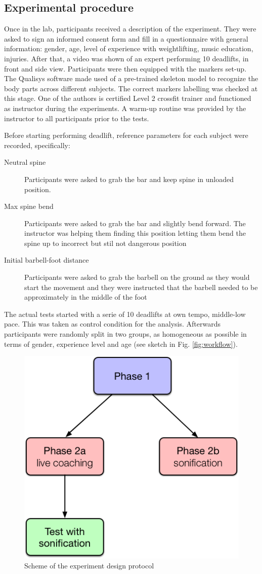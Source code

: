 \documentclass[10pt,letterpaper]{article}
\begin{document}
\subsection*{Experimental procedure}
Once in the lab, participants received a description of the experiment. They were asked to sign an informed consent form and fill in a questionnaire with general information: gender, age, level of experience with weightlifting, music education, injuries. After that, a video was shown of an expert performing 10 deadlifts, in front and side view.
Participants were then equipped with the markers set-up. The Qualisys software made used of a pre-trained skeleton model to recognize the body parts across different subjects. The correct markers labelling was checked at this stage. 
One of the authors is certified Level 2 crossfit trainer and functioned as instructor during the experiments. A warm-up routine was provided by the instructor to all participants prior to the tests.

Before starting performing deadlift, reference parameters for each subject were recorded, specifically:
\begin{description}
\item[Neutral spine] Participants were asked to grab the bar and keep spine in unloaded position.
\item[Max spine bend] Participants were asked to grab the bar and slightly bend forward. The instructor was helping them finding this position letting them bend the spine  up to incorrect but stil not dangerous position
\item[Initial barbell-foot distance] Participants were asked to grab the barbell on the ground as they would start the movement and they were instructed that the barbell needed to be approximately in the middle of the foot
\end{description}

The actual tests started with a serie of 10 deadlifts at own tempo, middle-low pace. This was taken as control condition for the analysis. Afterwards participants were randomly split in two groups, as homogeneous as possible in terms of gender, experience level and age (see sketch in Fig. \ref{fig:workflow}).
\begin{figure}[!h]
\center
\includegraphics[width=.5\textwidth]{figures/Experiment-flow.png}
\caption{Scheme of the experiment design protocol}
\label{fig:exp-flow}      
\end{figure}
\end{document}
